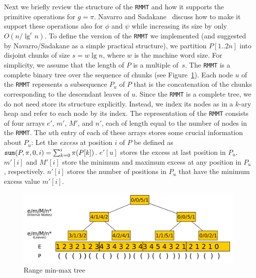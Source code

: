 Next we briefly review the structure of the {\tt RMMT} and how it supports
the primitive operations for $g = \pi$.
Navarro and Sadakane~\cite{Navarro:2014:FFS:2620785.2601073} discuss how
to make it support these operations also for $\phi$ and $\psi$ while increasing
its size by only $O(n/\lg^c n)$.
To define the version of the {\tt RMMT} we implemented (and suggested by
Navarro/Sadakane as a simple practical structure), we partition $P[1..2n]$ into
disjoint chunks of size $s = w \lg n$, where $w$ is the machine word size.
For simplicity, we assume that the length of $P$ is a multiple of~$s$.
The {\tt RMMT} is a complete binary tree over the sequence of chunks
(see Figure~\ref{fig:RangeMinMaxTree}).
Each node $u$ of the {\tt RMMT} represents a subsequence $P_u$ of $P$ that is
the concatenation of the chunks corresponding to the descendant leaves of $u$.
Since the {\tt RMMT} is a complete tree, we do not need store its structure
explicitly.
Instead, we index its nodes as in a $k$-ary heap and refer to each node by
its index.
The representation of the {\tt RMMT} consists of four arrays $e'$, $m'$,
$M'$, and $n'$, each of length equal to the number of nodes in the {\tt RMMT}.
The $u$th entry of each of these arrays stores some crucial information about
$P_u$:
Let the {\em excess} at position $i$ of $P$ be defined as $\mathtt{sum}(P,\pi,0,i) =
\sum_{k=0}^{i} \pi(P[k])$.
$e'[u]$ stores the excess at last position in $P_u$.
$m'[i]$ and $M'[i]$ store the minimum and maximum excess at any position in
$P_u$, respectively.
$n'[i]$ stores the number of positions in $P_u$ that have the minimum excess
value $m'[i]$.

\begin{figure}[t]
  \centering
  \includegraphics[scale=0.19]{./images/Range-min-max-tree.png}
  \caption{Range min-max tree}
  \label{fig:RangeMinMaxTree}
\end{figure}

